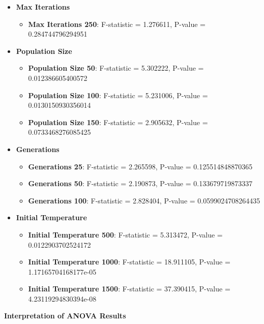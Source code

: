 \documentclass[
]{article}
\begin{document}
    \begin{itemize}
        \item \textbf{Max Iterations}
        \begin{itemize}
            \item \textbf{Max Iterations 250}: F-statistic = 1.276611, P-value = 0.284744796294951
        \end{itemize}
        \item \textbf{Population Size}
        \begin{itemize}
            \item \textbf{Population Size 50}: F-statistic = 5.302222, P-value = 0.012386605400572
            \item \textbf{Population Size 100}: F-statistic = 5.231006, P-value = 0.0130150930356014
            \item \textbf{Population Size 150}: F-statistic = 2.905632, P-value = 0.0733468276085425
        \end{itemize}
        \item \textbf{Generations}
        \begin{itemize}
            \item \textbf{Generations 25}: F-statistic = 2.265598, P-value = 0.125514848870365
            \item \textbf{Generations 50}: F-statistic = 2.190873, P-value = 0.133679719873337
            \item \textbf{Generations 100}: F-statistic = 2.828404, P-value = 0.0599024708264435
        \end{itemize}
        \item \textbf{Initial Temperature}
        \begin{itemize}
            \item \textbf{Initial Temperature 500}: F-statistic = 5.313472, P-value = 0.0122903702524172
            \item \textbf{Initial Temperature 1000}: F-statistic = 18.911105, P-value = 1.17165704168177e-05
            \item \textbf{Initial Temperature 1500}: F-statistic = 37.390415, P-value = 4.23119294830394e-08
        \end{itemize}
    \end{itemize}

    \textbf{Interpretation of ANOVA Results}
\end{document}
